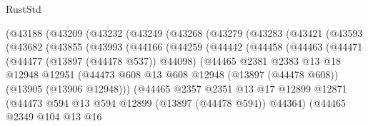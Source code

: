 \begin{lexlean}{RustStd}
\begin{coremodule}
          (@43188
            (@43209
              (@43232
                (@43249
                  (@43268
                    (@43279
                      (@43283
                        (@43421
                          (@43593
                            (@43682
                              (@43855
                                (@43993
                                  (@44166
                                    (@44259
                                      (@44442
                                        (@44458
                                          (@44463
                                            (@44471
                                              (@44477 (@13897 (@44478 @537)) @44098)
                                              (@44465
                                                @2381
                                                @2383
                                                @13
                                                @18
                                                @12948
                                                @12951
                                                (@44473
                                                  @608
                                                  @13
                                                  @608
                                                  @12948
                                                  (@13897 (@44478 @608))
                                                  (@13905 (@13906 @12948)))
                                                (@44465
                                                  @2357
                                                  @2351
                                                  @13
                                                  @17
                                                  @12899
                                                  @12871
                                                  (@44473
                                                    @594
                                                    @13
                                                    @594
                                                    @12899
                                                    (@13897 (@44478 @594))
                                                    @44364)
                                                  (@44465
                                                    @2349
                                                    @104
                                                    @13
                                                    @16

\end{coremodule}
\end{lexlean}
